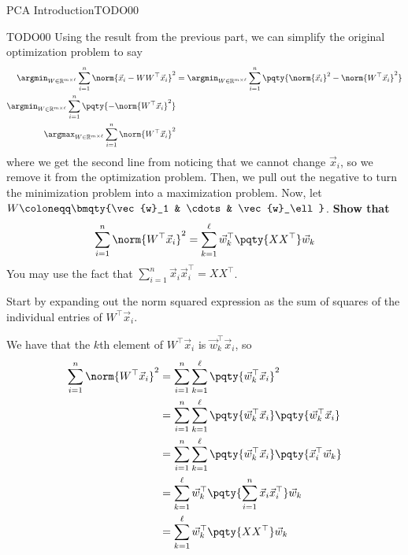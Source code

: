 \begin{problem}{PCA Introduction}{TODO}{0}{0}
\begin{problempartlist}
        \begin{problempart}{TODO}{0}{0}
            Using the result from the previous part, we can simplify the original optimization problem to say
            \begin{align}
                \argmin_{W \in \mathbb{R}^{m \times \ell}} \sum_{i = 1}^n \norm{\vec{x}_i - W W^\top \vec{x}_i}^2 &= \argmin_{W \in \mathbb{R}^{m \times \ell}} \sum_{i = 1}^n \pqty{\norm{\vec{x}_i}^2 - \norm{W^\top \vec{x}_i}^2} \\
                \argmin_{W \in \mathbb{R}^{m \times \ell}} \sum_{i = 1}^n \pqty{- \norm{W^\top \vec{x}_i}^2} \\
                \argmax_{W \in \mathbb{R}^{m \times \ell}} \sum_{i = 1}^n \norm{W^\top \vec{x}_i}^2
            \end{align}
            where we get the second line from noticing that we cannot change $\vec{x}_i$, so we remove it from the optimization problem. Then, we pull out the negative to turn the minimization problem into a maximization problem. Now, let $W \coloneqq \bmqty{\vec{w}_1 & \cdots & \vec{w}_\ell}$. \textbf{Show that
            \begin{equation}
                \sum_{i = 1}^n \norm{W^\top \vec{x}_i}^2 = \sum_{k = 1}^\ell \vec{w}_k^\top \pqty{X X^\top} \vec{w}_k
            \end{equation}}
            You may use the fact that $\sum_{i = 1}^n \vec{x}_i \vec{x}_i^\top = X X^\top$.
            \begin{hint}
                Start by expanding out the norm squared expression as the sum of squares of the individual entries of $W^\top \vec{x}_i$.
            \end{hint}
        \end{problempart}

        \begin{solution}{0in}
            We have that the $k$th element of $W^\top \vec{x}_i$ is $\vec{w}_k^\top \vec{x}_i$, so
            \begin{align}
                \sum_{i = 1}^n \norm{W^\top \vec{x}_i}^2 &= \sum_{i = 1}^n \sum_{k = 1}^\ell \pqty{\vec{w}_k^\top \vec{x}_i}^2 \\
                &= \sum_{i = 1}^n \sum_{k = 1}^\ell \pqty{\vec{w}_k^\top \vec{x}_i} \pqty{\vec{w}_k^\top \vec{x}_i} \\
                &= \sum_{i = 1}^n \sum_{k = 1}^\ell \pqty{\vec{w}_k^\top \vec{x}_i} \pqty{\vec{x}_i^\top \vec{w}_k} \\
                &= \sum_{k = 1}^\ell \vec{w}_k^\top \pqty{\sum_{i = 1}^n \vec{x}_i \vec{x}_i^\top} \vec{w}_k \\
                \label{eq:before_svd}
                &= \sum_{k = 1}^\ell \vec{w}_k^\top \pqty{X X^\top} \vec{w}_k
            \end{align}
        \end{solution}


\end{problempartlist}
\end{problem}
